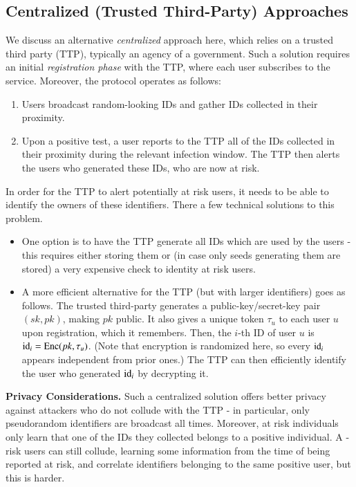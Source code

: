 \subsection{Centralized (Trusted Third-Party) Approaches}\label{sect:centr}

We discuss an alternative {\em centralized} approach here, which relies on a trusted third party (TTP), typically an agency of a government. Such a solution requires an initial {\em registration phase} with the TTP, where each user subscribes to the service. Moreover, the protocol operates as follows:
\begin{enumerate}    
\item Users broadcast random-looking IDs and gather IDs collected in their proximity. 
\item Upon a positive test, a user reports to the TTP all of the IDs collected in their proximity during the relevant infection window. The TTP then alerts the users who generated these IDs, who are now at risk.
\end{enumerate}
In order for the TTP to alert potentially at risk users, it needs to be able to identify the owners of these identifiers. There a few technical solutions to this problem. 
\begin{itemize}
\item One option is to have the TTP generate all IDs which are used by the users - this requires either storing them or (in case only seeds generating them are stored) a very expensive check to identity at risk users.
\item A more efficient alternative for the TTP (but with larger identifiers) goes as follows. The trusted third-party generates a public-key/secret-key pair $(sk, pk)$, making $pk$ public. It also gives a unique token $\tau_u$ to each user $u$ upon registration, which it remembers. Then, the $i$-th ID of user $u$ is $\mathrm{id}_i = \mathrm{Enc}(pk,\tau_u)$. (Note that encryption is randomized here, so every $\mathrm{id}_i$ appears independent from prior ones.) The TTP can then efficiently identify the user who generated $\mathrm{id}_i$ by decrypting it. 
\end{itemize}

{\bf Privacy Considerations.} Such a centralized solution offers better privacy against attackers who do not collude with the TTP - in particular, only pseudorandom identifiers are broadcast all times. Moreover, at risk individuals only learn that one of the IDs they collected belongs to a positive individual. A -risk users can still collude, learning some information from the time of being reported at risk, and correlate identifiers belonging to the same positive user, but this is harder.  


